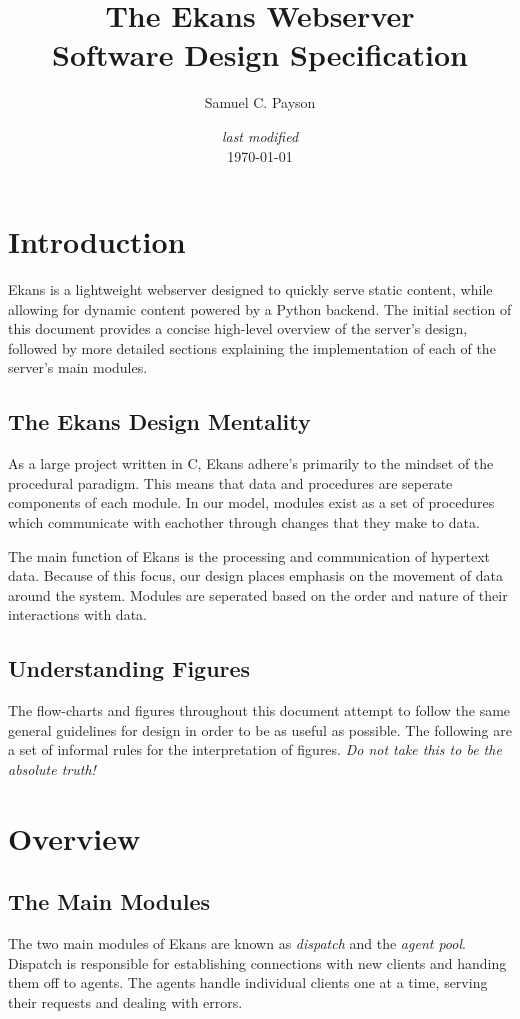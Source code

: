 \documentclass[11pt]{article}
\title{The Ekans Webserver \\ {\small\textbf{Software Design Specification}}}
\author {Samuel C. Payson}
\date{{\footnotesize \emph{last modified\\}}\today}
\begin{document}
\maketitle
\thispagestyle{empty}
\pagebreak
\pagestyle{fancy}
\setcounter{page}{1}
\tableofcontents
\pagebreak
\setcounter{page}{1}
\section{Introduction}
Ekans is a lightweight webserver designed to quickly serve static content, while allowing for dynamic content powered by a Python backend. The initial section of this document provides a concise high-level overview of the server's design, followed by more detailed sections explaining the implementation of each of the server's main modules.
\subsection{The Ekans Design Mentality}
As a large project written in C, Ekans adhere's primarily to the mindset of the procedural paradigm. This means that data and procedures are seperate components of each module. In our model, modules exist as a set of procedures which communicate with eachother through changes that they make to data.

The main function of Ekans is the processing and communication of hypertext data. Because of this focus, our design places emphasis on the movement of data around the system. Modules are seperated based on the order and nature of their interactions with data.

\subsection{Understanding Figures}
The flow-charts and figures throughout this document attempt to follow the same general guidelines for design in order to be as useful as possible. The following are a set of informal rules for the interpretation of figures. \emph{Do not take this to be the absolute truth!} 

\pagebreak

\section{Overview}

\subsection{The Main Modules}
The two main modules of Ekans are known as \emph{dispatch} and the \emph{agent pool}. Dispatch is responsible for establishing connections with new clients and handing them off to agents. The agents handle individual clients one at a time, serving their requests and dealing with errors.
\end{document}
